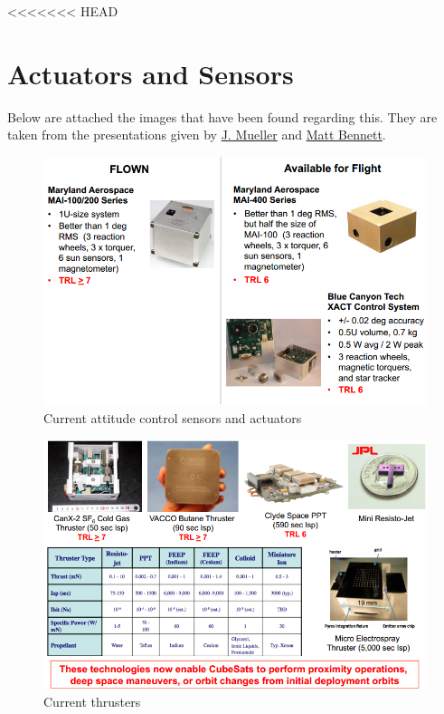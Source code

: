 <<<<<<< HEAD
\section{Actuators and Sensors}

Below are attached the images that have been found regarding this. They are taken from the presentations given by \href{http://kiss.caltech.edu/workshops/smallsat2012b/presentations/mueller.pdf}{J.	Mueller} and \href{http://kiss.caltech.edu/workshops/smallsat2012b/presentations/bennett.pdf}{Matt Bennett}. 

\begin{center}
\begin{figure}[!ht]
\includegraphics[scale=0.8]{attitude_control.png}
\caption{Current attitude control sensors and actuators}
\end{figure}
\newpage
\begin{figure}[!ht]
\includegraphics[scale=0.7]{prop_available.png}
\caption{Current thrusters}
\end{figure}
\end{center}

